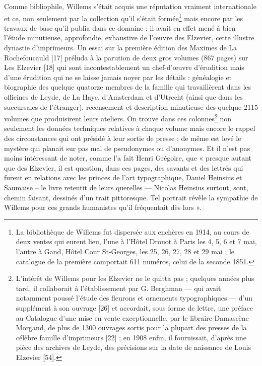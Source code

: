 \documentclass{book}%
\newcommand{\note}[1]{\footnote{#1}}
\begin{document}
Comme bibliophile, Willems s'était acquis une réputation vraiment internationale et ce, non seulement par la collection qu'il s'était formée\note{La bibliothèque de Willems fut dispersée aux enchères en 1914, au cours de deux ventes qui eurent lieu, l’une à l'Hôtel Drouot à Paris les 4, 5, 6 et 7 mai, l'autre à Gand, Hôtel Cour St-Georges, les 25, 26, 27, 28 et 29 mai ; le catalogue de la première comportait 611 numéros, celui de la seconde 1851.} mais encore par les travaux de base qu'il publia dans ce domaine ; il avait en effet mené à bien l'étude minutieuse, approfondie, exhaustive de l'œuvre des Elzevier, cette illustre dynastie d'imprimeurs.
Un essai sur la première édition des Maximes de La Rochefoucauld [17] préluda à la parution de deux gros volumes (867 pages) sur Les Elzevier [18] qui sont incontestablement un chef-d'œuvre d'érudition mais d'une érudition qui ne se laisse jamais noyer par les détails : généalogie et biographie des quelque quatorze membres de la famille qui travaillèrent dans les officines de Leyde, de La Haye, d'Amsterdam et d'Utrecht (ainsi que dans les succursales de l'étranger), recensement et description minutieuse des quelque 2115 volumes que produisirent leurs ateliers.
On trouve dans ces colonnes\note{L'intérêt de Willems pour les Elzevier ne le quitta pas ; quelques années plus tard, il collaborait à l'établissement par G. Berghman — qui avait notamment poussé l'étude des fleurons et ornements typographiques — d'un supplément à son ouvrage [26] et accordait, sous forme de lettre, une préface au Catalogue d'une mise en vente exceptionnelle, par le libraire Damascène Morgand, de plus de 1300 ouvrages sortis pour la plupart des presses de la célèbre famille d'imprimeurs [22] ; en 1908 enfin, il fournissait, d'après une pièce des archives de Leyde, des précisions sur la date de naissance de Louis Elzevier [54].} non seulement les données techniques relatives à chaque volume mais encore le rappel des circonstances qui ont présidé à leur sortie de presse ; de même est levé le mystère qui planait sur pas mal de pseudonymes ou d'anonymes.
Et il n'est pas moins intéressant de noter, comme l'a fait Henri Grégoire, que « presque autant que des Elzevier, il est question, dans ces pages, des savants et des lettrés qui furent en relations avec les princes de l'art typographique, Daniel Heinsius et Saumaise -- le livre retentit de leurs querelles — Nicolas Heinsius surtout, sont, chemin faisant, dessinés d'un trait pittoresque.
Tel portrait révèle la sympathie de Willems pour ces grands humanistes qu'il fréquentait dès lors ».\\
\end{document}
